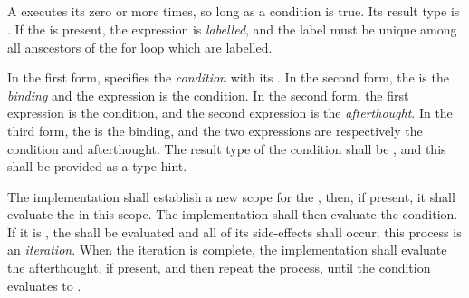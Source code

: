 
\begin{grammar}
 \\
	  \terminal{(}  \terminal{)}  \\

 \\
	 \\
	 \terminal{;}  \\
	 \terminal{;}  \\
	 \terminal{;}  \terminal{;}  \\

\exactly \\
	\terminal{:}  \\
\end{grammar}

\specsubsubitem
A  executes its  zero or more
times, so long as a condition is true. Its result type is .
If the  is present, the expression is \textit{labelled}, and
the label must be unique among all anscestors of the for loop which are
labelled.

\specsubsubitem
In the first form,  specifies the \textit{condition}
with its . In the second form, the
 is the \textit{binding} and the expression is the
condition. In the second form, the first expression is the condition, and the
second expression is the \textit{afterthought}. In the third form, the
 is the binding, and the two expressions are
respectively the condition and afterthought. The result type of the condition
shall be , and this shall be provided as a type hint.

\specsubsubitem
The implementation shall establish a new scope for the
, then, if present, it shall evaluate the
 in this scope. The implementation shall then evaluate the
condition. If it is , the  shall be
evaluated and all of its side-effects shall occur; this process is an
\textit{iteration}. When the iteration is complete, the implementation shall
evaluate the afterthought, if present, and then repeat the process, until the
condition evaluates to .

